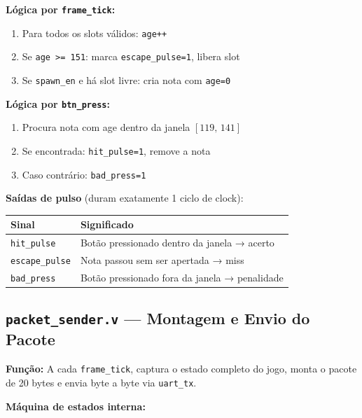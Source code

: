 \documentclass[12pt,a4paper]{article}
\begin{document}
\textbf{Lógica por \texttt{frame\_tick}:}
\begin{enumerate}
    \item Para todos os slots válidos: \texttt{age++}
    \item Se \texttt{age >= 151}: marca \texttt{escape\_pulse=1}, libera slot
    \item Se \texttt{spawn\_en} e há slot livre: cria nota com \texttt{age=0}
\end{enumerate}

\textbf{Lógica por \texttt{btn\_press}:}
\begin{enumerate}
    \item Procura nota com age dentro da janela $[119,\,141]$
    \item Se encontrada: \texttt{hit\_pulse=1}, remove a nota
    \item Caso contrário: \texttt{bad\_press=1}
\end{enumerate}

\textbf{Saídas de pulso} (duram exatamente 1 ciclo de clock):
\begin{center}
\begin{tabular}{ll}
\toprule
\textbf{Sinal} & \textbf{Significado} \\
\midrule
\texttt{hit\_pulse}    & Botão pressionado dentro da janela → acerto \\
\texttt{escape\_pulse} & Nota passou sem ser apertada → miss \\
\texttt{bad\_press}    & Botão pressionado fora da janela → penalidade \\
\bottomrule
\end{tabular}
\end{center}

\subsection{\texttt{packet\_sender.v} — Montagem e Envio do Pacote}

\textbf{Função:} A cada \texttt{frame\_tick}, captura o estado completo do jogo, monta o pacote de 20 bytes e envia byte a byte via \texttt{uart\_tx}.

\textbf{Máquina de estados interna:}
\end{document}
